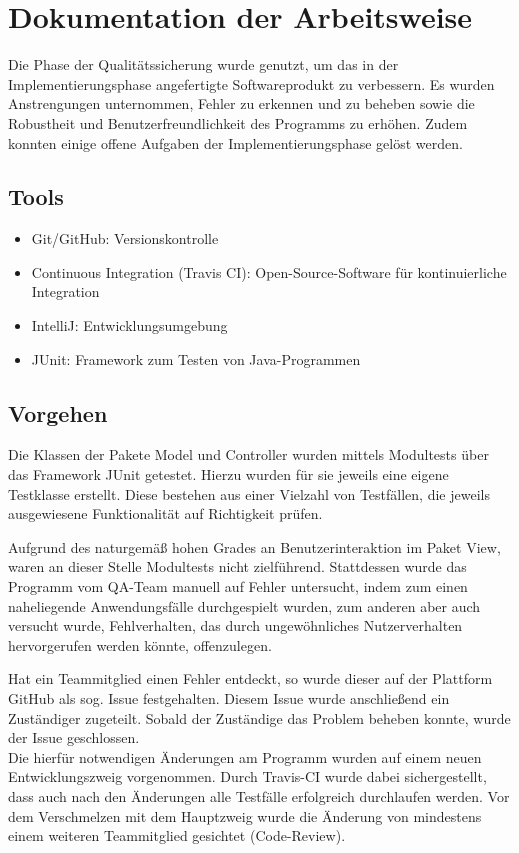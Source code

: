 \section{Dokumentation der Arbeitsweise}

Die Phase der Qualitätssicherung wurde genutzt, um das in der Implementierungsphase angefertigte Softwareprodukt zu verbessern. Es wurden Anstrengungen unternommen, Fehler zu erkennen und zu beheben sowie die Robustheit und Benutzerfreundlichkeit des Programms zu erhöhen.
Zudem konnten einige offene Aufgaben der Implementierungsphase gelöst werden.

\subsection{Tools}

\begin{itemize}
\item Git/GitHub: Versionskontrolle
\item Continuous Integration (Travis CI): Open-Source-Software für kontinuierliche Integration
\item IntelliJ: Entwicklungsumgebung
\item JUnit: Framework zum Testen von Java-Programmen
\end{itemize}

\subsection{Vorgehen}

Die Klassen der Pakete Model und Controller wurden mittels Modultests über das Framework JUnit getestet. Hierzu wurden für sie jeweils eine eigene Testklasse erstellt. Diese bestehen aus einer Vielzahl von Testfällen, die jeweils ausgewiesene Funktionalität auf Richtigkeit prüfen.

Aufgrund des naturgemäß hohen Grades an Benutzerinteraktion im Paket View, waren an dieser Stelle Modultests nicht zielführend. Stattdessen wurde das Programm vom QA-Team manuell auf Fehler untersucht, indem zum einen naheliegende Anwendungsfälle durchgespielt wurden, zum anderen aber auch versucht wurde, Fehlverhalten, das durch ungewöhnliches Nutzerverhalten hervorgerufen werden könnte, offenzulegen.

Hat ein Teammitglied einen Fehler entdeckt, so wurde dieser auf der Plattform GitHub als sog. Issue festgehalten. Diesem Issue wurde anschließend ein Zuständiger zugeteilt. Sobald der Zuständige das Problem beheben konnte, wurde der Issue geschlossen.\\
Die hierfür notwendigen Änderungen am Programm wurden auf einem neuen Entwicklungszweig vorgenommen. Durch Travis-CI wurde dabei sichergestellt, dass auch nach den Änderungen alle Testfälle erfolgreich durchlaufen werden. Vor dem Verschmelzen mit dem Hauptzweig wurde die Änderung von mindestens einem weiteren Teammitglied gesichtet (Code-Review).

